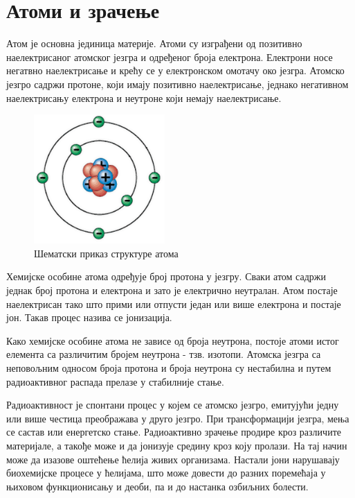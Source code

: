 \documentclass[11pt,a4paper,serbian,oneside]{book}
\begin{document}
\section{Атоми и зрачење}

Атом је основна јединица материје. Атоми су изграђени од позитивно наелектрисаног атомског језгра и одређеног броја електрона. Електрони носе негатвно наелектрисање и крећу се у електронском омотачу око језгра. Атомско језгро садржи протоне, који имају позитивно наелектрисање, једнако негативном наелектрисању електрона и неутроне који немају наелектрисање. 

\begin{figure}[h]
\begin{center}
\leavevmode
\includegraphics[width=50mm]{images/atom.png}
\end{center}
\caption{Шематски приказ структуре атома}
\label{fig:atom}
\end{figure}

Хемијске особине атома одређује број протона у језгру. Сваки атом садржи једнак број протона и електрона и зато је електрично неутралан.  Атом постаје наелектрисан тако што прими или отпусти један или више електрона и постаје јон. Такав процес назива се јонизација.

Како хемијске особине атома не зависе од броја неутрона, постоје атоми истог елемента са различитим бројем неутрона - тзв. изотопи. Атомска језгра са неповољним односом броја протона и броја неутрона су нестабилна и путем радиоактивног распада прелазе у стабилније стање.

Радиоактивност је спонтани процес у којем се атомско језгро, емитујући једну или више честица преображава у друго језгро. При трансформацији језгра, мења се састав или енергетско стање. Радиоактивно зрачење продире кроз различите материјале, а такође може и да јонизује средину кроз коју пролази. На тај начин може да изазове оштећење ћелија живих организама. Настали јони нарушавају биохемијске процесе у ћелијама, што може довести до разних поремећаја у њиховом функционисању и деоби, па и до настанка озбиљних болести.
\end{document}
